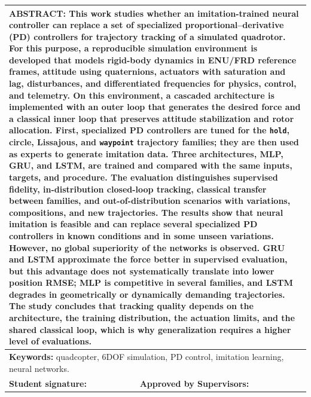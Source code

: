 \clearpage
\thispagestyle{empty}
\noindent
\begin{tabular}{|p{}|p{}|}
\hline
\multicolumn{2}{|p{0.95\textwidth}|}{\textbf{ABSTRACT:}\newline
This work studies whether an imitation-trained neural controller can replace a set of specialized proportional--derivative (PD) controllers for trajectory tracking of a simulated quadrotor. For this purpose, a reproducible simulation environment is developed that models rigid-body dynamics in ENU/FRD reference frames, attitude using quaternions, actuators with saturation and lag, disturbances, and differentiated frequencies for physics, control, and telemetry. On this environment, a cascaded architecture is implemented with an outer loop that generates the desired force and a classical inner loop that preserves attitude stabilization and rotor allocation. First, specialized PD controllers are tuned for the \texttt{hold}, circle, Lissajous, and \texttt{waypoint} trajectory families; they are then used as experts to generate imitation data. Three architectures, MLP, GRU, and LSTM, are trained and compared with the same inputs, targets, and procedure. The evaluation distinguishes supervised fidelity, in-distribution closed-loop tracking, classical transfer between families, and out-of-distribution scenarios with variations, compositions, and new trajectories. The results show that neural imitation is feasible and can replace several specialized PD controllers in known conditions and in some unseen variations. However, no global superiority of the networks is observed. GRU and LSTM approximate the force better in supervised evaluation, but this advantage does not systematically translate into lower position RMSE; MLP is competitive in several families, and LSTM degrades in geometrically or dynamically demanding trajectories. The study concludes that tracking quality depends on the architecture, the training distribution, the actuation limits, and the shared classical loop, which is why generalization requires a higher level of evaluations.} \\
\hline
\multicolumn{2}{|p{0.95\textwidth}|}{\textbf{Keywords:} quadcopter, 6DOF simulation, PD control, imitation learning, neural networks.} \\
\hline
\textbf{Student signature:} 
& \textbf{Approved by Supervisors:} \\[1.0cm]
\hline
\end{tabular}
\normalsize
\setlength{\tabcolsep}{6pt}
\renewcommand{\arraystretch}{1}
